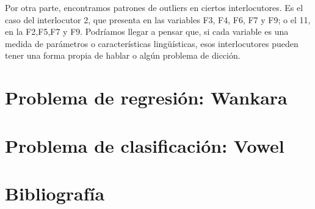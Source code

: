 Por otra parte, encontramos patrones de outliers en ciertos interlocutores. Es el caso del interlocutor 2, que presenta en las variables F3, F4, F6, F7 y F9; o el 11, en la F2,F5,F7 y F9. Podríamos llegar a pensar que, si cada variable es una medida de parámetros o características lingüísticas, esos interlocutores pueden tener una forma propia de hablar o algún problema de dicción. 


\section{Problema de regresión: Wankara}






\section{Problema de clasificación: Vowel}


\newpage
\section{Bibliografía}




